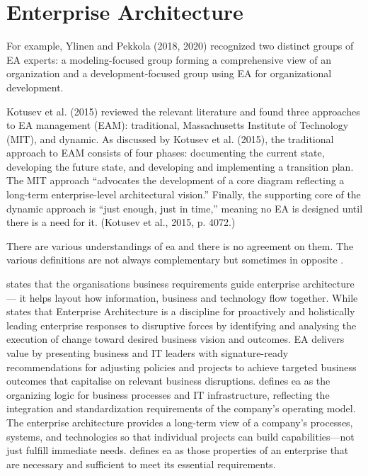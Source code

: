 \section{Enterprise Architecture}
\label{sec:tbea}

\begin{remark}
For example, Ylinen and Pekkola (2018, 2020) recognized two distinct groups of EA experts: a modeling-focused group forming a comprehensive view of an organization and a development-focused group using EA for organizational development. \parencite[p. 16]{Nurmi2021}

Kotusev et al. (2015) reviewed the relevant literature and found three approaches to EA management (EAM): traditional, Massachusetts Institute of Technology (MIT), and dynamic. As discussed by Kotusev et al. (2015), the traditional approach to EAM consists of four phases: documenting the current state, developing the future state, and developing and implementing a transition plan. The MIT approach “advocates the development of a core diagram reflecting a long-term enterprise-level architectural vision.” Finally, the supporting core of the dynamic approach is “just enough, just in time,” meaning no EA is designed until there is a need for it. (Kotusev et al., 2015, p. 4072.)
\end{remark}

There are various understandings of \acrlong{ea} and there is no agreement on them. The various definitions are not always complementary but sometimes in opposite \parencite{Lapalme2012,SaintLouis2019,Hoogervorst2009}.

\textcite{White2018} states that the organisations business requirements guide enterprise architecture — it helps layout how information, business and technology flow together. While \textcite{Gartner} states that Enterprise Architecture is a discipline for proactively and holistically leading enterprise responses to disruptive forces by identifying and analysing the execution of change toward desired business vision and outcomes. EA delivers value by presenting business and IT leaders with signature-ready recommendations for adjusting policies and projects to achieve targeted business outcomes that capitalise on relevant business disruptions. \textcite[p. 9]{Ross2014} defines \acrshort{ea} as the organizing logic for business processes and IT infrastructure, reflecting the integration and standardization requirements of the company’s operating model. The enterprise architecture provides a long-term view of a company’s processes, systems, and technologies so that individual projects can build capabilities—not just fulfill immediate needs. \textcite[p. 24]{Greefhorst2011} defines \acrshort{ea} as those properties of an enterprise that are necessary and sufficient to meet its essential requirements.

